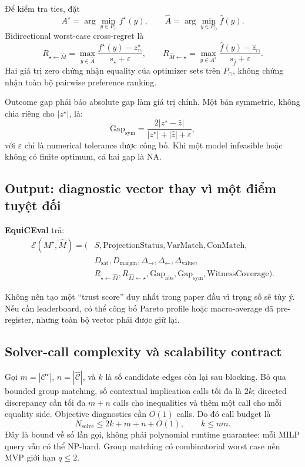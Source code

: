 \documentclass[11pt,a4paper]{article}
\newcommand{\method}{\textsf{\textbf{EquiCEval}}\xspace}
\begin{document}
Để kiểm tra ties, đặt
\[
A^\star=\arg\min_{y\in P_\cap} f^\star(y),\qquad
\widehat A=\arg\min_{y\in P_\cap}\widehat f(y).
\]
Bidirectional worst-case cross-regret là
\[
R_{\star\leftarrow\widehat M}=
\max_{y\in\widehat A}
\frac{f^\star(y)-z^\star_\cap}{s_\star+\varepsilon},
\qquad
R_{\widehat M\leftarrow\star}=
\max_{y\in A^\star}
\frac{\widehat f(y)-\widehat z_\cap}{s_{\hat f}+\varepsilon}.
\]
Hai giá trị zero chứng nhận equality của optimizer sets trên \(P_\cap\), không
chứng nhận toàn bộ pairwise preference ranking.

Outcome gap phải báo absolute gap làm giá trị chính. Một bản symmetric,
không chia riêng cho \(|z^\star|\), là:
\[
\mathrm{Gap}_{\mathrm{sym}} =
\frac{2|z^\star-\hat z|}
{|z^\star|+|\hat z|+\varepsilon},
\]
với \(\varepsilon\) chỉ là numerical tolerance được công bố. Khi một model
infeasible hoặc không có finite optimum, cả hai gap là \(\mathrm{NA}\).

\subsection{Output: diagnostic vector thay vì một điểm tuyệt đối}

\method trả:
\[
\begin{aligned}
\mathcal E(M^\star,\widehat M)=\bigl(&S,\mathrm{ProjectionStatus},
\mathrm{VarMatch},\mathrm{ConMatch},\\
&D_{\mathrm{sat}},D_{\mathrm{margin}},
\Delta_{\rightarrow},\Delta_{\leftarrow},\Delta_{\mathrm{value}},\\
&R_{\star\leftarrow\widehat M},R_{\widehat M\leftarrow\star},
\mathrm{Gap}_{\mathrm{abs}},\mathrm{Gap}_{\mathrm{sym}},
\mathrm{WitnessCoverage}\bigr).
\end{aligned}
\]

Không nên tạo một ``trust score'' duy nhất trong paper đầu vì trọng số sẽ tùy ý.
Nếu cần leaderboard, có thể công bố Pareto profile hoặc macro-average đã
pre-register, nhưng toàn bộ vector phải được giữ lại.

\subsection{Solver-call complexity và scalability contract}

Gọi \(m=|\mathcal C^\star|\), \(n=|\widehat{\mathcal C}|\), và \(k\) là số
candidate edges còn lại sau blocking. Bỏ qua bounded group matching, số
contextual implication calls tối đa là \(2k\); directed discrepancy cần tối đa
\(m+n\) calls cho inequalities và thêm một call cho mỗi equality side. Objective
diagnostics cần \(O(1)\) calls. Do đó call budget là
\[
N_{\mathrm{solve}}\leq 2k+m+n+O(1),
\qquad k\leq mn.
\]
Đây là bound về số lần gọi, không phải polynomial runtime guarantee: mỗi MILP
query vẫn có thể NP-hard. Group matching có combinatorial worst case nên MVP
giới hạn \(q\leq2\).
\end{document}
